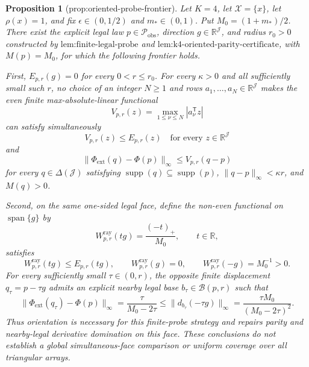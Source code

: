 \documentclass{article}
\newtheorem{proposition}{Proposition}
\begin{document}
\begin{proposition}[prop:oriented-probe-frontier]\label{prop:oriented-probe-frontier}
Let \(K=4\), let \(\mathcal X=\{x\}\), let \(\rho(x)=1\), and fix \(\epsilon\in(0,1/2)\) and \(m_*\in(0,1)\).  Put \(M_0=(1+m_*)/2\).  There exist the explicit legal law \(p\in\mathcal P_{\mathrm{obs}}\), direction \(g\in\mathbb R^{\mathcal J}\), and radius \(r_0>0\) constructed by \(\text{lem:finite-legal-probe}\) and \(\text{lem:k4-oriented-parity-certificate}\), with \(M(p)=M_0\), for which the following frontier holds.

First, \(E_{p,r}(g)=0\) for every \(0<r\le r_0\).  For every \(\kappa>0\) and all sufficiently small such \(r\), no choice of an integer \(N\ge1\) and rows \(a_1,\ldots,a_N\in\mathbb R^{\mathcal J}\) makes the even finite max-absolute-linear functional
\[
 V_{p,r}(z)=\max_{1\le\nu\le N}|a_\nu^{\mathsf T}z|
\]
can satisfy simultaneously
\[
 V_{p,r}(z)\le E_{p,r}(z)\quad\text{for every }z\in\mathbb R^{\mathcal J}
\tag{P1}
\]
and
\[
 \|\Phi_{\mathrm{ext}}(q)-\Phi(p)\|_\infty
 \le V_{p,r}(q-p)
\tag{P2}
\]
for every \(q\in\Delta(\mathcal J)\) satisfying \(\operatorname{supp}(q)\subseteq\operatorname{supp}(p)\), \(\|q-p\|_\infty<\kappa r\), and \(M(q)>0\).

Second, on the same one-sided legal face, define the non-even functional on \(\operatorname{span}\{g\}\) by
\[
 W^{\mathrm{ray}}_{p,r}(tg)=\frac{(-t)_+}{M_0},\qquad t\in\mathbb R,
\]
satisfies
\[
 W^{\mathrm{ray}}_{p,r}(tg)\le E_{p,r}(tg),\qquad
 W^{\mathrm{ray}}_{p,r}(g)=0,
 \qquad
 W^{\mathrm{ray}}_{p,r}(-g)=M_0^{-1}>0.
\tag{P3}
\]
For every sufficiently small \(\tau\in(0,r)\), the opposite finite displacement \(q_\tau=p-\tau g\) admits an explicit nearby legal base \(b_\tau\in\mathcal B(p,r)\) such that
\[
 \|\Phi_{\mathrm{ext}}(q_\tau)-\Phi(p)\|_\infty
 =\frac{\tau}{M_0-2\tau}
 \le \|d_{b_\tau}(-\tau g)\|_\infty
 =\frac{\tau M_0}{(M_0-2\tau)^2}.
\tag{P4}
\]
Thus orientation is necessary for this finite-probe strategy and repairs parity and nearby-legal derivative domination on this face.  These conclusions do not establish a global simultaneous-face comparison or uniform coverage over all triangular arrays.
\end{proposition}
\end{document}

